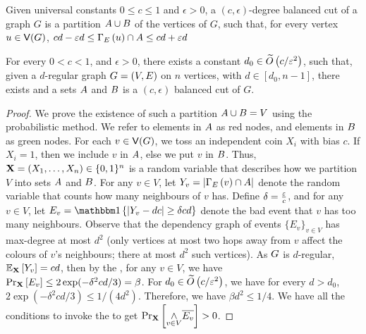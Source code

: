 \documentclass[11pt]{article}
\begin{document}
\begin{definition}\label{defn:balanced-cuts} Given universal constants $0 \leq c \leq 1$ and $\epsilon > 0$, a $(c, \epsilon)$-degree balanced cut of a graph $G$ is a partition $\RedA \cup \GreenB$ of the vertices of $G$, such that, for every vertex $u \in \Vertices{G}$,  $cd - \epsilon d \leq \Neighbourhood{E}{u} \cap \RedA \leq cd + \epsilon d $
\end{definition}


\begin{lemma}\label{thm:partition}
For every $0 < c < 1$, and $\epsilon > 0$, there exists a constant $d_0 \in \BigOTilde{c/\epsilon^2}$, such that, given a $d$-regular graph $\Graph = (V, E)$ on $n$ vertices, with $d \in [d_0, n-1]$, there exists and a  sets $\red{A}$ and $\green{B}$ is a $(c, \epsilon)$ balanced cut of $G$.
\end{lemma}

\begin{proof}
  We prove the existence of such a partition $\RedA \cup \GreenB = V$ using the probabilistic method.
We refer to elements in $\RedA$ as red nodes, and elements in $\GreenB$ as green nodes.
For each $v \in \Vertices{\Graph}$, we toss an independent coin $X_i$ with bias $c$.
If $X_i = 1$, then we include $v$ in $\RedA$, else we put $v$ in $\GreenB$.
Thus, $\vec{X} \Def (X_1, \dots, X_n) \in \bit^n$ is a random variable that describes how we partition $V$ into sets $\RedA$ and $\GreenB$.
For any $v \in V$, let $Y_v \Def |\Neighbourhood{E}{v} \cap \RedA|$ denote the random variable that counts how many  neighbours of $v$ has.
Define $\delta \Def \frac{\epsilon}{c}$, and for any $v \in V$, let $E_v = \Indicator{|Y_v - d c | \geq \delta c d}$ denote the bad event that $v$ has too many  neighbours.
Observe that the dependency graph of events $\{ E_v \}_{v \in V}$ has max-degree at most $d^2$ (only vertices at most two hops away from $v$ affect the colours of $v$'s neighbours; there at most $d^2$ such vertices).
As $\Graph$ is $d$-regular, $\Mean{\vec{X}}{Y_v} = c d$, then by the , for any $v \in V$, we have $\PProb{E_v}{\vec{X}} \leq 2\exp(-\delta^2c d/3) \Def \beta$.
For $d_0 \in \BigOTilde{c/\epsilon^2}$, we have for every $d > d_0$,  $2\exp(-\delta^2c d/3) \leq 1/(4d^2)$.
Therefore, we have $\beta d^2 \leq 1/4$.
We have all the conditions to invoke the  to get $\PProb{\underset{{v\in V}}{\land}\Complement{E_v}}{\vec{X}} > 0$.
\end{proof}
\end{document}
